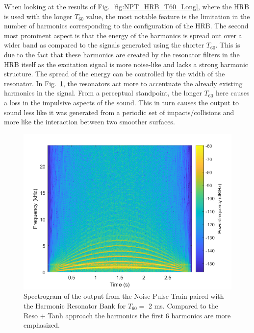 \documentclass[../main.tex]{subfiles}
\begin{document}
When looking at the results of Fig.~\ref{fig:NPT_HRB_T60_Long}, where the HRB is used with the longer $T_{60}$ value, the most notable feature is the limitation in the number of harmonics corresponding to the configuration of the HRB. The second most prominent aspect is that the energy of the harmonics is spread out over a wider band as compared to the signals generated using the shorter $T_{60}$. This is due to the fact that these harmonics are created by the resonator filters in the HRB itself as the excitation signal is more noise-like and lacks a strong harmonic structure. The spread of the energy can be controlled by the width of the resonator. In Fig.~\ref{fig:NPT_HRB_T60_Short}, the resonators act more to accentuate the already existing harmonics in the signal. From a perceptual standpoint, the longer $T_{60}$ here causes a loss in the impulsive aspects of the sound. This in turn causes the output to sound less like it was generated from a periodic set of impacts/collisions and more like the interaction between two smoother surfaces.

\begin{figure}[h]
    \centering
    \includegraphics[scale=.65]{./images/plots/NPTHRBT60Short.png}
    \caption{Spectrogram of the output from the Noise Pulse Train paired with the Harmonic Resonator Bank for $T_{60} = $ 2 ms. Compared to the Reso + Tanh approach the harmonics the first 6 harmonics are more emphasized.}
    \label{fig:NPT_HRB_T60_Short}
\end{figure}
\end{document}
